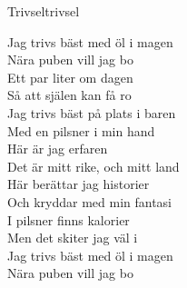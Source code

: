 \begin{song}{Trivsel}{trivsel}
\begin{vers}
Jag trivs bäst med öl i magen\\
Nära puben vill jag bo\\
Ett par liter om dagen\\
Så att själen kan få ro\\
Jag trivs bäst på plats i baren\\
Med en pilsner i min hand\\
Här är jag erfaren\\
Det är mitt rike, och mitt land\\
Här berättar jag historier\\
Och kryddar med min fantasi\\
I pilsner finns kalorier\\
Men det skiter jag väl i\\
Jag trivs bäst med öl i magen\\
Nära puben vill jag bo\\
\end{vers}
\end{song}
